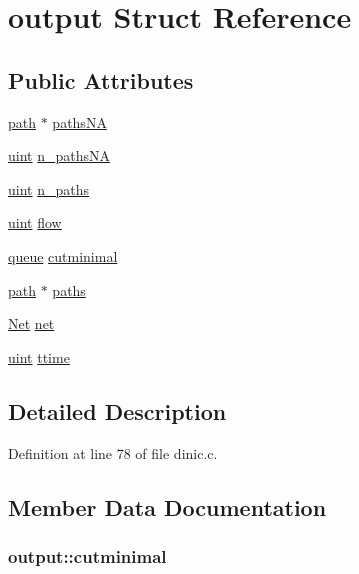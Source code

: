 \hypertarget{structoutput}{
\section{output Struct Reference}
\label{structoutput}
}
\subsection*{Public Attributes}
\begin{DoxyCompactItemize}
\item 
\hyperlink{structpath}{path} $\ast$ \hyperlink{structoutput_a86f2f616dc4828be22de10d4d36fc353}{pathsNA}
\item 
\hyperlink{dinic_8c_a91ad9478d81a7aaf2593e8d9c3d06a14}{uint} \hyperlink{structoutput_ad060ae8bd6f94c7aba0642813120ab4e}{n\_\-pathsNA}
\item 
\hyperlink{dinic_8c_a91ad9478d81a7aaf2593e8d9c3d06a14}{uint} \hyperlink{structoutput_aa980d6936e4721676b8a33fd8b304322}{n\_\-paths}
\item 
\hyperlink{dinic_8c_a91ad9478d81a7aaf2593e8d9c3d06a14}{uint} \hyperlink{structoutput_addc7c459e69ce4a8a5c6199e14a6ca9d}{flow}
\item 
\hyperlink{structqueue}{queue} \hyperlink{structoutput_a0c963cb2e6b143c17dcae474c5bd7edb}{cutminimal}
\item 
\hyperlink{structpath}{path} $\ast$ \hyperlink{structoutput_af94f35ded05674483a752d14b5bf8688}{paths}
\item 
\hyperlink{structnet}{Net} \hyperlink{structoutput_ada4c12dc3b04413cfac919d1225b5bdf}{net}
\item 
\hyperlink{dinic_8c_a91ad9478d81a7aaf2593e8d9c3d06a14}{uint} \hyperlink{structoutput_a4fe5134901a07f53d54989c1c90fb221}{ttime}
\end{DoxyCompactItemize}


\subsection{Detailed Description}


Definition at line 78 of file dinic.c.



\subsection{Member Data Documentation}
\hypertarget{structoutput_a0c963cb2e6b143c17dcae474c5bd7edb}{
\subsubsection[{cutminimal}]{ {\bf output::cutminimal}}}
\label{structoutput_a0c963cb2e6b143c17dcae474c5bd7edb}


